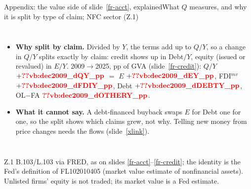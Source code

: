 \documentclass[aspectratio=169,10pt,t]{beamer}
\newcommand{\vget}[2]{\ifcsname #1:#2\endcsname\csname #1:#2\endcsname\else\textcolor{red}{\textbf{??#1:\detokenize{#2}}}\fi}
\newcommand{\vb}[1]{\vget{vb}{#1}}%
\newcommand{\src}[1]{\vfill{\tiny\textcolor{muted}{#1}\par}\vspace{0.04cm}}
\newcommand{\slref}[1]{slide~\ref{#1}}
\begin{document}
\begin{frame}[label=xvalue]{Appendix: the value side of \slref{fr-acct}, explained}{What $Q$ measures, and why it is split by type of claim; NFC sector (Z.1)}
\begin{columns}[T]
{\begin{itemize}
\item \textbf{Why split by claim.} Divided by $Y$, the terms add up to $Q/Y$, so a change in $Q/Y$ splits exactly by claim: credit shows up in Debt$/Y$, equity (issued or revalued) in $E/Y$. 2009$\to$2025, pp of GVA (\slref{fr-credit}): $Q/Y$ $+\vb{dec2009_dQY_pp}$ $=$ $E$ $+\vb{dec2009_dEY_pp}$, FDI$^{mv}$ $+\vb{dec2009_dFDIY_pp}$, Debt $+\vb{dec2009_dDEBTY_pp}$, OL$-$FA $\vb{dec2009_dOTHERY_pp}$.
\item \textbf{What it cannot say.} A debt-financed buyback swaps $E$ for Debt one for one, so the split shows which claims grew, not why. Telling new money from price changes needs the flows (\slref{xlink}).
\end{itemize}}
\end{columns}
\src{Z.1 B.103/L.103 via FRED, as on slides \ref{fr-acct}--\ref{fr-credit}; the identity is the Fed's definition of FL102010405 (market value estimate of nonfinancial assets). Unlisted firms' equity is not traded; its market value is a Fed estimate.}
\end{frame}
\end{document}

